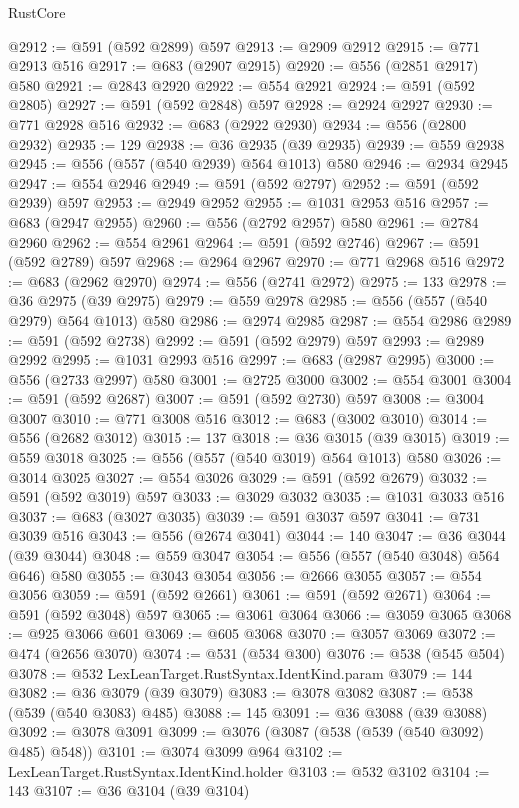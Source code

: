 \begin{lexlean}{RustCore}
\begin{coremodule}
@2912 := @591 (@592 @2899) @597
@2913 := @2909 @2912
@2915 := @771 @2913 @516
@2917 := @683 (@2907 @2915)
@2920 := @556 (@2851 @2917) @580
@2921 := @2843 @2920
@2922 := @554 @2921
@2924 := @591 (@592 @2805)
@2927 := @591 (@592 @2848) @597
@2928 := @2924 @2927
@2930 := @771 @2928 @516
@2932 := @683 (@2922 @2930)
@2934 := @556 (@2800 @2932)
@2935 := 129
@2938 := @36 @2935 (@39 @2935)
@2939 := @559 @2938
@2945 := @556 (@557 (@540 @2939) @564 @1013) @580
@2946 := @2934 @2945
@2947 := @554 @2946
@2949 := @591 (@592 @2797)
@2952 := @591 (@592 @2939) @597
@2953 := @2949 @2952
@2955 := @1031 @2953 @516
@2957 := @683 (@2947 @2955)
@2960 := @556 (@2792 @2957) @580
@2961 := @2784 @2960
@2962 := @554 @2961
@2964 := @591 (@592 @2746)
@2967 := @591 (@592 @2789) @597
@2968 := @2964 @2967
@2970 := @771 @2968 @516
@2972 := @683 (@2962 @2970)
@2974 := @556 (@2741 @2972)
@2975 := 133
@2978 := @36 @2975 (@39 @2975)
@2979 := @559 @2978
@2985 := @556 (@557 (@540 @2979) @564 @1013) @580
@2986 := @2974 @2985
@2987 := @554 @2986
@2989 := @591 (@592 @2738)
@2992 := @591 (@592 @2979) @597
@2993 := @2989 @2992
@2995 := @1031 @2993 @516
@2997 := @683 (@2987 @2995)
@3000 := @556 (@2733 @2997) @580
@3001 := @2725 @3000
@3002 := @554 @3001
@3004 := @591 (@592 @2687)
@3007 := @591 (@592 @2730) @597
@3008 := @3004 @3007
@3010 := @771 @3008 @516
@3012 := @683 (@3002 @3010)
@3014 := @556 (@2682 @3012)
@3015 := 137
@3018 := @36 @3015 (@39 @3015)
@3019 := @559 @3018
@3025 := @556 (@557 (@540 @3019) @564 @1013) @580
@3026 := @3014 @3025
@3027 := @554 @3026
@3029 := @591 (@592 @2679)
@3032 := @591 (@592 @3019) @597
@3033 := @3029 @3032
@3035 := @1031 @3033 @516
@3037 := @683 (@3027 @3035)
@3039 := @591 @3037 @597
@3041 := @731 @3039 @516
@3043 := @556 (@2674 @3041)
@3044 := 140
@3047 := @36 @3044 (@39 @3044)
@3048 := @559 @3047
@3054 := @556 (@557 (@540 @3048) @564 @646) @580
@3055 := @3043 @3054
@3056 := @2666 @3055
@3057 := @554 @3056
@3059 := @591 (@592 @2661)
@3061 := @591 (@592 @2671)
@3064 := @591 (@592 @3048) @597
@3065 := @3061 @3064
@3066 := @3059 @3065
@3068 := @925 @3066 @601
@3069 := @605 @3068
@3070 := @3057 @3069
@3072 := @474 (@2656 @3070)
@3074 := @531 (@534 @300)
@3076 := @538 (@545 @504)
@3078 := @532 LexLeanTarget.RustSyntax.IdentKind.param
@3079 := 144
@3082 := @36 @3079 (@39 @3079)
@3083 := @3078 @3082
@3087 := @538 (@539 (@540 @3083) @485)
@3088 := 145
@3091 := @36 @3088 (@39 @3088)
@3092 := @3078 @3091
@3099 := @3076 (@3087 (@538 (@539 (@540 @3092) @485) @548))
@3101 := @3074 @3099 @964
@3102 := LexLeanTarget.RustSyntax.IdentKind.holder
@3103 := @532 @3102
@3104 := 143
@3107 := @36 @3104 (@39 @3104)

\end{coremodule}
\end{lexlean}
